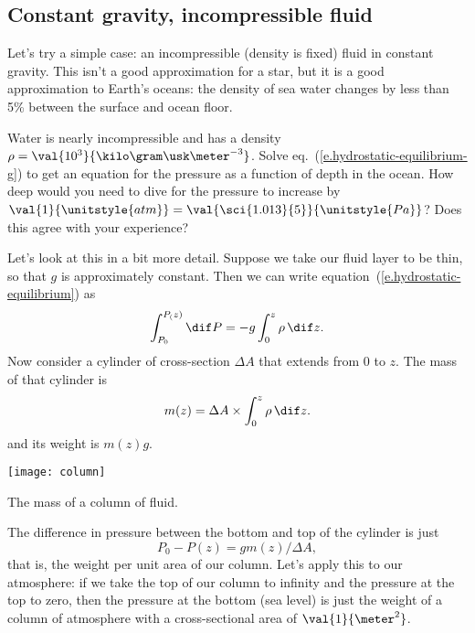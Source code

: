 \subsection{Constant gravity, incompressible fluid}

Let's try a simple case: an incompressible (density is fixed) fluid in constant gravity. This isn't a good approximation for a star, but it is a good approximation to Earth's oceans: the density of sea water changes by less than 5\% between the surface and ocean floor.

\begin{exercisebox}
Water is nearly incompressible and has a density $\rho = \val{10^{3}}{\kilo\gram\usk\meter^{-3}}$. Solve eq.~(\ref{e.hydrostatic-equilibrium-g}) to get an equation for the pressure as a function of depth in the ocean. How deep would you need to dive for the pressure to increase by $\val{1}{\unitstyle{atm}} = \val{\sci{1.013}{5}}{\unitstyle{Pa}}$? Does this agree with your experience?
\end{exercisebox}

Let's look at this in a bit more detail.  Suppose we take our fluid layer to be thin, so that $g$ is approximately constant. Then we can write equation~(\ref{e.hydrostatic-equilibrium}) as
\[ \int_{P_{0}}^{P_(z)} \dif P = -g\int_{0}^{z} \rho\,\dif z. \]
Now consider a cylinder of cross-section $\Delta A$ that extends from $0$ to $z$.  The mass of that cylinder is
\[ m(z) = \Delta A\times\int_{0}^{z}\rho \,\dif z.
\]
and its weight is $m(z)g$.
\begin{marginfigure}
\centering\texttt{[image: column]}
\caption[The mass of a column of fluid]{
The mass of a column of fluid.
\label{f.column}}
\end{marginfigure}

The difference in pressure between the bottom and top of the cylinder is just
\[ P_{0}-P(z) = g m(z)/\Delta A, \]
that is, the weight per unit area of our column.  Let's apply this to our atmosphere:
if we take the top of our column to infinity and the pressure at the top to zero, then the pressure at the bottom (sea level) is just the weight of a column of atmosphere with a cross-sectional area of $\val{1}{\meter^{2}}$.

